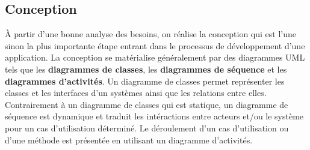     \subsection{Conception}
    À partir d’une bonne analyse des besoins, on réalise la conception qui est l’une sinon la plus importante étape entrant dans le processus de développement d’une application. La conception se matérialise généralement par des diagrammes UML tels que les \textbf{diagrammes de classes}, les \textbf{diagrammes de séquence} et les \textbf{diagrammes d'activités}. Un diagramme de classes permet représenter les classes et les interfaces d'un systèmes ainsi que les relations entre elles. Contrairement à un diagramme de classes qui est statique, un diagramme de séquence est dynamique et traduit les intéractions entre acteurs et/ou le système pour un cas d'utilisation déterminé. Le déroulement d'un cas d'utilisation ou d'une méthode est présentée en utilisant un diagramme d'activités.
    

